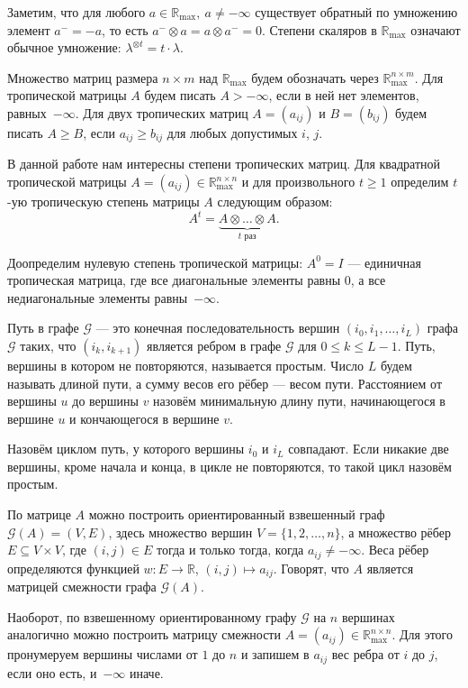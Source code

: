 \documentclass[12pt]{article}
\theoremstyle{definition}
\begin{document}
Заметим, что для любого $a \in \mathbb{R}_{\max}, \ a \ne -\infty$ существует обратный по умножению элемент $a^- = -a$, то есть $a^- \otimes a = a \otimes a^- = 0$. Степени скаляров в $\mathbb{R}_{\max}$ означают обычное умножение: $\lambda^{\otimes t} = t \cdot \lambda$.

Множество матриц размера $n \times m$ над $\mathbb{R}_{\max}$ будем обозначать через $\mathbb{R}_{\max}^{n \times m}$. Для тропической матрицы $A$ будем писать $A > -\infty$, если в ней нет элементов, равных~$-\infty$. Для двух тропических матриц $A = (a_{ij})$ и $B = (b_{ij})$ будем писать $A \ge B$, если $a_{ij} \ge b_{ij}$ для любых допустимых $i$, $j$.

В данной работе нам интересны степени тропических матриц. Для квадратной тропической матрицы $A = (a_{ij}) \in \mathbb{R}_{\max}^{n \times n}$ и для произвольного $t \ge 1$ определим $t$-ую тропическую степень матрицы $A$ следующим образом: \begin{equation*}
A^t = \underbrace{A \otimes \dots \otimes A}_{t \text{ раз}}.
\end{equation*}

Доопределим нулевую степень тропической матрицы: $A^0 = I$ --- единичная тропическая матрица, где все диагональные элементы равны $0$, а все недиагональные элементы равны~$-\infty$.

Путь в графе $\mathcal{G}$ --- это конечная последовательность вершин $(i_0, i_1, \dots, i_L)$ графа $\mathcal{G}$ таких, что $(i_k, i_{k + 1})$ является ребром в графе $\mathcal{G}$ для $0 \le k \le L - 1$. Путь, вершины в котором не повторяются, называется простым. Число $L$ будем называть длиной пути, а сумму весов его рёбер --- весом пути. Расстоянием от вершины $u$ до вершины $v$ назовём минимальную длину пути, начинающегося в вершине $u$ и кончающегося в вершине $v$.

Назовём циклом путь, у которого вершины $i_0$ и $i_L$ совпадают. Если никакие две вершины, кроме начала и конца, в цикле не повторяются, то такой цикл назовём простым. 

По матрице $A$ можно построить ориентированный взвешенный граф $\mathcal{G}(A) = (V, E)$, здесь множество вершин $V = \{ 1, 2, \dots, n\}$, а множество рёбер $E \subseteq V \times V$, где $(i, j) \in E$ тогда и только тогда, когда $a_{ij} \ne -\infty$. Веса рёбер определяются функцией $w : E \rightarrow \mathbb{R}$, $(i, j) \mapsto a_{ij}$. Говорят, что $A$ является матрицей смежности графа $\mathcal{G}(A)$.

Наоборот, по взвешенному ориентированному графу $\mathcal{G}$ на $n$ вершинах аналогично можно построить матрицу смежности $A = (a_{ij}) \in \mathbb{R}_{\max}^{n \times n}$. Для этого пронумеруем вершины числами от $1$ до $n$ и запишем в $a_{ij}$ вес ребра от $i$ до $j$, если оно есть, и~$-\infty$ иначе.
\end{document}
